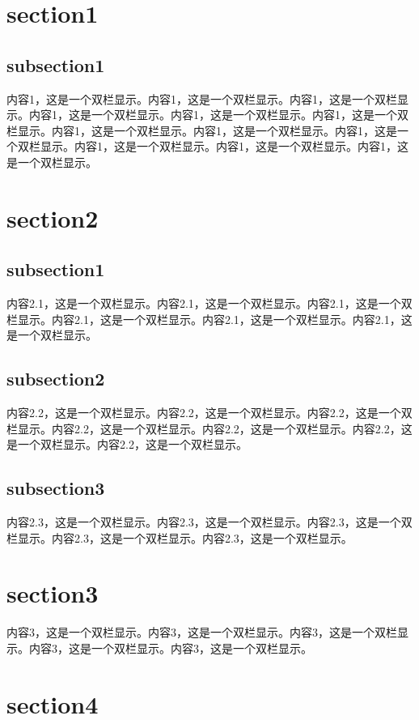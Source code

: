 \documentclass[a4pper]{article}
\begin{document}
\begin{multicols}{2}
\section{section1}
    \subsection{subsection1}
    内容1，这是一个双栏显示。\cite{ref1}内容1，这是一个双栏显示。内容1，这是一个双栏显示。内容1，这是一个双栏显示。内容1，这是一个双栏显示。内容1，这是一个双栏显示。内容1，这是一个双栏显示。内容1，这是一个双栏显示。内容1，这是一个双栏显示。内容1，这是一个双栏显示。内容1，这是一个双栏显示。内容1，这是一个双栏显示。\cite{ref1, ref4}


\section{section2}
    \subsection{subsection1}
    内容2.1，这是一个双栏显示。内容2.1，这是一个双栏显示。内容2.1，这是一个双栏显示。内容2.1，这是一个双栏显示。内容2.1，这是一个双栏显示。内容2.1，这是一个双栏显示。
    \subsection{subsection2}
    内容2.2，这是一个双栏显示。内容2.2，这是一个双栏显示。内容2.2，这是一个双栏显示。内容2.2，这是一个双栏显示。内容2.2，这是一个双栏显示。内容2.2，这是一个双栏显示。内容2.2，这是一个双栏显示。
    \subsection{subsection3}
    内容2.3，这是一个双栏显示。内容2.3，这是一个双栏显示。内容2.3，这是一个双栏显示。内容2.3，这是一个双栏显示。内容2.3，这是一个双栏显示。

\section{section3}
    内容3，这是一个双栏显示。内容3，这是一个双栏显示。内容3，这是一个双栏显示。内容3，这是一个双栏显示。内容3，这是一个双栏显示。

\section{section4}

\end{multicols}
\end{document}
